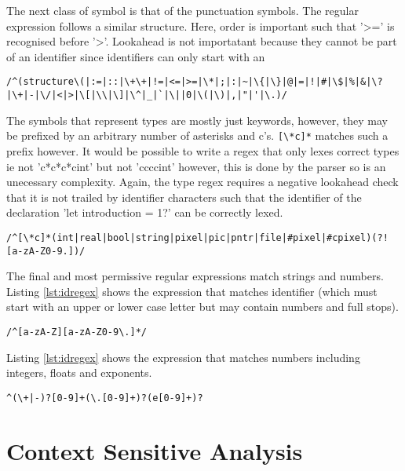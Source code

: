 \documentclass{article}
\begin{document}
The next class of symbol is that of the punctuation symbols. The regular expression follows a similar structure. Here, order is important such that '>=' is recognised before '>'. Lookahead is not importatant because they cannot be part of an identifier since identifiers can only start with an 

\begin{lstlisting}[caption={},label={lst:puncregex}, escapechar="|"]
/^(structure\(|:=|::|\+\+|!=|<=|>=|\*|;|:|~|\{|\}|@|=|!|#|\$|%|&|\?|\+|-|\/|<|>|\[|\\|\]|\^|_|`|\||0|\(|\)|,|"|'|\.)/
\end{lstlisting}

The symbols that represent types are mostly just keywords, however, they may be prefixed by an arbitrary number of asterisks and c's. \lstinline{[\*c]*} matches such a prefix however. It would be possible to write a regex that only lexes correct types ie not 'c*c*c*cint' but not 'ccccint' however, this is done by the parser so is an unecessary complexity. Again, the type regex requires a negative lookahead check that it is not trailed by identifier characters such that the identifier of the declaration 'let introduction = 1?' can be correctly lexed.

\begin{lstlisting}[caption={},label={lst:typeregex}, escapechar="|"]
/^[\*c]*(int|real|bool|string|pixel|pic|pntr|file|#pixel|#cpixel)(?![a-zA-Z0-9.])/
\end{lstlisting}

The final and most permissive regular expressions match strings and numbers. Listing \ref{lst:idregex} shows the expression that matches identifier (which must start with an upper or lower case letter but may contain numbers and full stops).

\begin{lstlisting}[caption={},label={lst:idregex}, escapechar="|"]
/^[a-zA-Z][a-zA-Z0-9\.]*/
\end{lstlisting}

Listing \ref{lst:idregex} shows the expression that matches numbers including integers, floats and exponents.

\begin{lstlisting}[caption={},label={lst:numberregex}, escapechar="|"]
^(\+|-)?[0-9]+(\.[0-9]+)?(e[0-9]+)?
\end{lstlisting}

\section{Context Sensitive Analysis}
\end{document}

